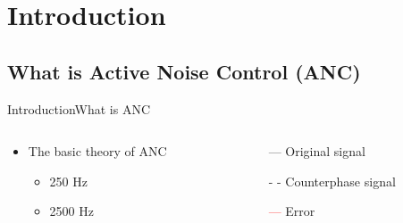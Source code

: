 \section{Introduction}
\subsection{What is Active Noise Control (ANC)}
\begin{frame}{Introduction}{What is ANC}		
	\begin{columns}
		\begin{column}{0.5\textwidth}
				\begin{itemize}
					\item The basic theory of ANC
					\begin{itemize}
						\item 250 Hz
						\item 2500 Hz 
					\end{itemize}	
				\end{itemize}
			\vspace{-2.5mm}	
		\begin{center}
	 		
	 	\end{center}
		\end{column}
		\begin{column}{0.5\textwidth} 
			\begin{itemize}
				\item[\textcolor{MATLABblue}{---}] Original signal
				\item[\textcolor{MATLABblue}{- -}] Counterphase signal
				\item[\textcolor{red}{---}] Error
			\end{itemize}
		\begin{center}
	 		
	 	\end{center}
		\end{column}
	\end{columns}
\end{frame}





